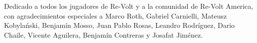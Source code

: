 Dedicado a todos los jugadores de Re-Volt y a la comunidad de Re-Volt America, con agradecimientos especiales a Marco Roth, Gabriel Carnielli, Mateusz Kobylański, Benjamín Mosso, Juan Pablo Rosas, Leandro Rodríguez, Dario Chaile, Vicente Aguilera, Benjamín Contreras y Josafat Jiménez.
